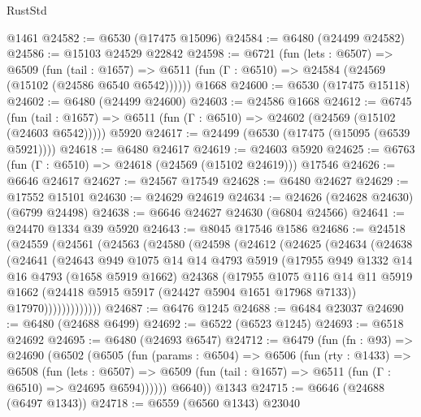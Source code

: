\begin{lexlean}{RustStd}
\begin{coremodule}
    @1461
@24582 := @6530 (@17475 @15096)
@24584 := @6480 (@24499 @24582)
@24586 := @15103 @24529 @22842
@24598 := @6721
    (fun (lets : @6507) =>
    @6509
      (fun (tail : @1657) =>
      @6511 (fun (Γ : @6510) => @24584 (@24569 (@15102 (@24586 @6540 @6542))))))
    @1668
@24600 := @6530 (@17475 @15118)
@24602 := @6480 (@24499 @24600)
@24603 := @24586 @1668
@24612 := @6745
    (fun (tail : @1657) => @6511 (fun (Γ : @6510) => @24602 (@24569 (@15102 (@24603 @6542)))))
    @5920
@24617 := @24499 (@6530 (@17475 (@15095 (@6539 @5921))))
@24618 := @6480 @24617
@24619 := @24603 @5920
@24625 := @6763 (fun (Γ : @6510) => @24618 (@24569 (@15102 @24619))) @17546
@24626 := @6646 @24617
@24627 := @24567 @17549
@24628 := @6480 @24627
@24629 := @17552 @15101
@24630 := @24629 @24619
@24634 := @24626 (@24628 @24630) (@6799 @24498)
@24638 := @6646 @24627 @24630 (@6804 @24566)
@24641 := @24470 @1334 @39 @5920
@24643 := @8045 @17546 @1586
@24686 := @24518
    (@24559
      (@24561
        (@24563
          (@24580
            (@24598
              (@24612
                (@24625
                  (@24634
                    (@24638
                      (@24641
                        (@24643
                          @949
                          @1075
                          @14
                          @14
                          @4793
                          @5919
                          (@17955
                            @949
                            @1332
                            @14
                            @16
                            @4793
                            (@1658 @5919 @1662)
                            @24368
                            (@17955
                              @1075
                              @116
                              @14
                              @11
                              @5919
                              @1662
                              (@24418 @5915 @5917 (@24427 @5904 @1651 @17968 @7133))
                              @17970)))))))))))))
@24687 := @6476 @1245
@24688 := @6484 @23037
@24690 := @6480 (@24688 @6499)
@24692 := @6522 (@6523 @1245)
@24693 := @6518 @24692
@24695 := @6480 (@24693 @6547)
@24712 := @6479
    (fun (fn : @93) =>
    @24690
      (@6502
        (@6505
          (fun (params : @6504) =>
          @6506
            (fun (rty : @1433) =>
            @6508
              (fun (lets : @6507) =>
              @6509 (fun (tail : @1657) => @6511 (fun (Γ : @6510) => @24695 @6594))))))
        @6640))
    @1343
@24715 := @6646 (@24688 (@6497 @1343))
@24718 := @6559 (@6560 @1343) @23040

\end{coremodule}
\end{lexlean}
